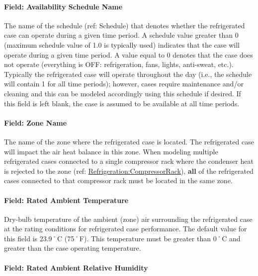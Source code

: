 \paragraph{Field: Availability Schedule Name}\label{field-availability-schedule-name-014}

The name of the schedule (ref: Schedule) that denotes whether the refrigerated case can operate during a given time period. A schedule value greater than 0 (maximum schedule value of 1.0 is typically used) indicates that the case will operate during a given time period. A value equal to 0 denotes that the case does not operate (everything is OFF: refrigeration, fans, lights, anti-sweat, etc.). Typically the refrigerated case will operate throughout the day (i.e., the schedule will contain 1 for all time periods); however, cases require maintenance and/or cleaning and this can be modeled accordingly using this schedule if desired. If this field is left blank, the case is assumed to be available at all time periods.

\paragraph{Field: Zone Name}\label{field-zone-name-010}

The name of the zone where the refrigerated case is located. The refrigerated case will impact the air heat balance in this zone. When modeling multiple refrigerated cases connected to a single compressor rack where the condenser heat is rejected to the zone (ref: \hyperref[refrigerationcompressorrack]{Refrigeration:CompressorRack}), \textbf{all} of the refrigerated cases connected to that compressor rack must be located in the same zone.

\paragraph{Field: Rated Ambient Temperature}\label{field-rated-ambient-temperature}

Dry-bulb temperature of the ambient (zone) air surrounding the refrigerated case at the rating conditions for refrigerated case performance. The default value for this field is 23.9˚C (75˚F). This temperature must be greater than 0˚C and greater than the case operating temperature.

\paragraph{Field: Rated Ambient Relative Humidity}\label{field-rated-ambient-relative-humidity}

